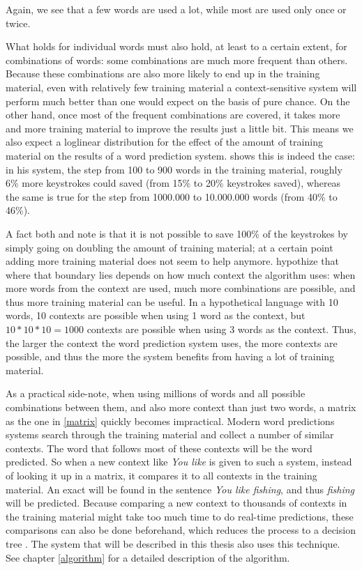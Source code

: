 \documentclass[12pt]{article}
\begin{document}

Again, we see that a few words are used a lot, while most are used only once or twice.

What holds for individual words must also hold, at least to a certain extent, for combinations of words: some combinations are much more frequent than others. Because these combinations are also more likely to end up in the training material, even with relatively few training material a context-sensitive system will perform much better than one would expect on the basis of pure chance. On the other hand, once most of the frequent combinations are covered, it takes more and more training material to improve the results just a little bit. This means we also expect a loglinear distribution for the effect of the amount of training material on the results of a word prediction system.  shows this is indeed the case: in his system, the step from 100 to 900 words in the training material, roughly 6\% more keystrokes could saved (from 15\% to 20\% keystrokes saved), whereas the same is true for the step from 1000.000 to 10.000.000 words (from 40\% to 46\%).

A fact both  and  note is that it is not possible to save 100\% of the keystrokes by simply going on doubling the amount of training material; at a certain point adding more training material does not seem to help anymore.  hypothize that where that boundary lies depends on how much context the algorithm uses: when more words from the context are used, much more combinations are possible, and thus more training material can be useful. In a hypothetical language with 10 words, 10 contexts are possible when using 1 word as the context, but $10*10*10 = 1000$ contexts are possible when using 3 words as the context. Thus, the larger the context the word prediction system uses, the more contexts are possible, and thus the more the system benefits from having a lot of training material.

As a practical side-note, when using millions of words and all possible combinations between them, and also more context than just two words, a matrix as the one in \ref{matrix} quickly becomes impractical. Modern word predictions systems search through the training material and collect a number of similar contexts. The word that follows most of these contexts will be the word predicted. So when a new context like \emph{You like} is given to such a system, instead of looking it up in a matrix, it compares it to all contexts in the training material. An exact will be found in the sentence \emph{You like fishing}, and thus \emph{fishing} will be predicted. Because comparing a new context to thousands of contexts in the training material might take too much time to do real-time predictions, these comparisons can also be done beforehand, which reduces the process to a decision tree . The system that will be described in this thesis also uses this technique. See chapter \ref{algorithm} for a detailed description of the algorithm.
\end{document}
